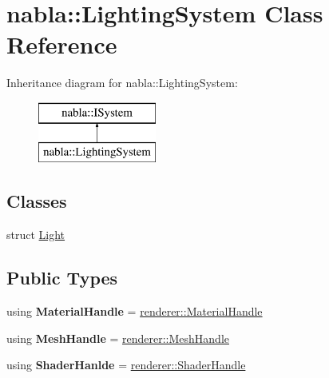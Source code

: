 \hypertarget{classnabla_1_1_lighting_system}{}\section{nabla\+::Lighting\+System Class Reference}
\label{classnabla_1_1_lighting_system}
Inheritance diagram for nabla\+::Lighting\+System\+:\begin{figure}[H]
\begin{center}
\leavevmode
\includegraphics[height=2.000000cm]{classnabla_1_1_lighting_system}
\end{center}
\end{figure}
\subsection*{Classes}
\begin{DoxyCompactItemize}
\item 
struct \mbox{\hyperlink{structnabla_1_1_lighting_system_1_1_light}{Light}}
\end{DoxyCompactItemize}
\subsection*{Public Types}
\begin{DoxyCompactItemize}
\item 
\mbox{\label{classnabla_1_1_lighting_system_a60e313e3eaed50905362f90ef8e76bdc}} 
using {\bfseries Material\+Handle} = \mbox{\hyperlink{classnabla_1_1renderer_1_1_handle}{renderer\+::\+Material\+Handle}}
\item 
\mbox{\label{classnabla_1_1_lighting_system_a6178ba1165c7fe00db97c5a8de033305}} 
using {\bfseries Mesh\+Handle} = \mbox{\hyperlink{classnabla_1_1renderer_1_1_handle}{renderer\+::\+Mesh\+Handle}}
\item 
\mbox{\label{classnabla_1_1_lighting_system_a64b6f64cd854c25a7856487e973277c3}} 
using {\bfseries Shader\+Hanlde} = \mbox{\hyperlink{classnabla_1_1renderer_1_1_handle}{renderer\+::\+Shader\+Handle}}
\end{DoxyCompactItemize}
